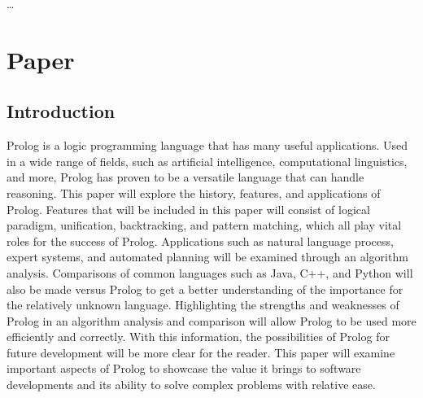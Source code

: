 \documentclass{article}
\theoremstyle{theorem}
\theoremstyle{definition}
\theoremstyle{remark}
\begin{document}
\ldots

\section{Paper}
\subsection{Introduction}

Prolog is a logic programming language that has many useful applications. Used in a wide range of fields, such as artificial intelligence, computational linguistics, and more, Prolog has proven to be a versatile language that can handle reasoning. This paper will explore the history, features, and applications of Prolog. Features that will be included in this paper will consist of logical paradigm, unification, backtracking, and pattern matching, which all play vital roles for the success of Prolog. Applications such as natural language process, expert systems, and automated planning will be examined through an algorithm analysis. Comparisons of common languages such as Java, C++, and Python will also be made versus Prolog to get a better understanding of the importance for the relatively unknown language. Highlighting the strengths and weaknesses of Prolog in an algorithm analysis and comparison will allow Prolog to be used more efficiently and correctly. With this information, the possibilities of Prolog for future development will be more clear for the reader. This paper will examine important aspects of Prolog to showcase the value it brings to software developments and its ability to solve complex problems with relative ease.\newline
\end{document}
